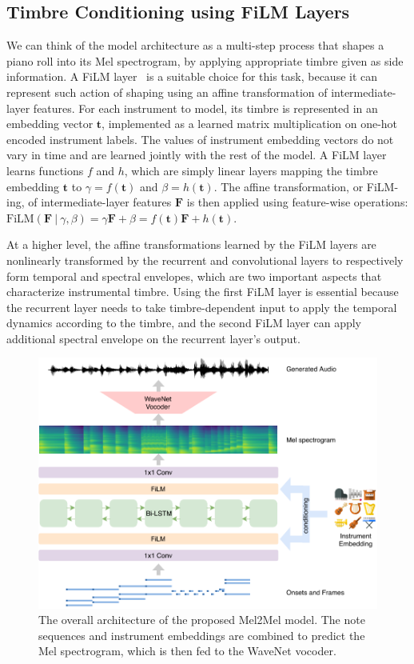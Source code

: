 \subsection{Timbre Conditioning using FiLM Layers}

We can think of the model architecture as a multi-step process that shapes a piano roll into its Mel spectrogram, by applying appropriate timbre given as side information.
A FiLM layer~\cite{perez2018film} is a suitable choice for this task, because it can represent such action of shaping using an affine transformation of intermediate-layer features.
For each instrument to model, its timbre is represented in an embedding vector $\mathbf{t}$, implemented as a learned matrix multiplication on one-hot encoded instrument labels.
The values of instrument embedding vectors do not vary in time and are learned jointly with the rest of the model.
A FiLM layer learns functions $f$ and $h$, which are simply linear layers mapping the timbre embedding $\mathbf{t}$ to $\gamma = f ( \mathbf{t} )$ and $\beta = h ( \mathbf{t} )$.
The affine transformation, or FiLM-ing, of intermediate-layer features $\mathbf{F}$ is then applied using feature-wise operations: $
\mathrm{FiLM}(\mathbf{F} ~|~ \gamma, \beta)
= \gamma \mathbf{F} + \beta
= f(\mathbf{t})\mathbf{F} + h(\mathbf{t}). $

At a higher level, the affine transformations learned by the FiLM layers are nonlinearly transformed by the recurrent and convolutional layers to respectively form temporal and spectral envelopes, which are two important aspects that characterize instrumental timbre.
Using the first FiLM layer is essential because the recurrent layer needs to take timbre-dependent input to apply the temporal dynamics according to the timbre, and the second FiLM layer can apply additional spectral envelope on the recurrent layer's output.

\begin{figure}[t]
	\centering
	\includegraphics[width=\linewidth]{architecture.pdf}
	\caption{The overall architecture of the proposed Mel2Mel model. The note sequences and instrument embeddings are combined to predict the Mel spectrogram, which is then fed to the WaveNet vocoder.}
	\label{fig:mel2mel-architecture}
\end{figure}

